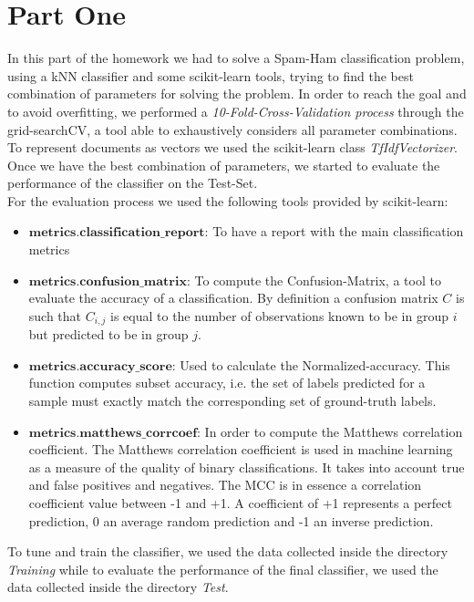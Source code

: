 \documentclass[11pt]{article}
\begin{document}
\section{Part One}
In this part of the homework we had to solve a Spam-Ham classification problem, using a kNN classifier and some scikit-learn tools, trying to find the best combination of parameters for solving the problem. In order to reach the goal and to avoid overfitting, we performed a \textit{10-Fold-Cross-Validation process} through the grid-searchCV, a tool able to exhaustively considers all parameter combinations. To represent documents as vectors we used the scikit-learn class \textit{TfIdfVectorizer}.  Once we have the best combination of parameters, we started to evaluate the performance of the classifier on the Test-Set.  \\
For the evaluation process we used the following tools provided by scikit-learn:
\begin{itemize}
\item{$\textbf{metrics.classification\_report:}$} To have a report with the main classification metrics
\item{$\textbf{metrics.confusion\_matrix:}$} To compute the Confusion-Matrix, a tool to evaluate the accuracy of a classification. By definition a confusion matrix $C$ is such that $C_{i, j}$ is equal to the number of observations known to be in group $i$ but predicted to be in group $j$. 
\item{$\textbf{metrics.accuracy\_score:}$} Used to calculate the Normalized-accuracy. This function computes subset accuracy, i.e. the set of labels predicted for a sample must exactly match the corresponding set of ground-truth labels. 
\item{$\textbf{metrics.matthews\_corrcoef:}$} In order to compute the Matthews correlation coefficient. The Matthews correlation coefficient is used in machine learning as a measure of the quality of binary classifications. It takes into account true and false positives and negatives. The MCC is in essence a correlation coefficient value between -1 and +1. A coefficient of +1 represents a perfect prediction, 0 an average random prediction and -1 an inverse prediction. 
\end{itemize}
To tune and train the classifier, we used the data collected inside the directory \textit{Training} while to evaluate the performance of the final classifier, we used the data collected inside the directory \textit{Test}.\\
\end{document}
